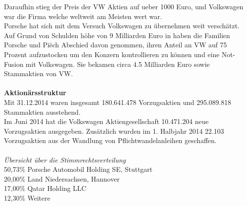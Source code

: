 \documentclass[12pt]{article}
\begin{document}
Daraufhin stieg der Preis der VW Aktien auf ueber 1000 Euro, und Volkswagen war die Firma welche weltweit am Meisten wert war. \\
Porsche hat sich mit dem Versuch Volkswagen zu übernehmen weit verschätzt. Auf Grund von Schulden höhe von 9 Milliarden Euro in haben die Familien Porsche und Piëch Abschied davon genommen, ihren Anteil an VW auf 75 Prozent aufzustocken um den Konzern kontrollieren zu können und eine Not-Fusion mit Volkswagen. Sie bekamen circa 4.5 Milliarden Euro sowie Stammaktien von VW. \cite{squeezy}\\\\
\textbf{Aktionärsstruktur}\\
Mit 31.12.2014 waren insgesamt 180.641.478 Vorzugsaktien und 295.089.818 Stammaktien ausstehend.\\
Im Juni 2014 hat die Volkswagen Aktiengesellschaft 10.471.204 neue Vorzugsaktien ausgegeben. Zusätzlich wurden im 1. Halbjahr 2014 22.103 Vorzugsaktien aus der Wandlung von Pflichtwandelanleihen geschaffen.
\cite{aktionaersstruktur} \\ \\
\textit{Übersicht über die Stimmrechtsverteilung} \\
50,73\% Porsche Automobil Holding SE, Stuttgart\\
20,00\% Land Niedersachsen, Hannover\\
17,00\% Qatar Holding LLC\\
12,30\% Weitere
\end{document}
